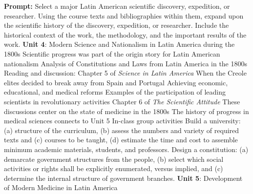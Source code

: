 \documentclass[10pt]{article}
\begin{document}
\begin{outline}[enumerate]
\2 \textbf{Prompt:} Select a major Latin American scientific discovery, expedition, or researcher.  Using the course texts and bibliographies within them, expand upon the scientific history of the discovery, expedition, or researcher.  Include the historical context of the work, the methodology, and the important results of the work.
\1 \textbf{Unit 4}: Modern Science and Nationalism in Latin America during the 1800s
\2 Scientific progress was part of the origin story for Latin American nationalism
\2 Analysis of Constitutions and Laws from Latin America in the 1800s
\2 Reading and discussion:
\3 Chapter 5 of \textit{Science in Latin America}
\4 When the Creole elites decided to break away from Spain and Portugal
\4 Achieving economic, educational, and medical reforms
\4 Examples of the participation of leading scientists in revolutionary activities
\3 Chapter 6 of \textit{The Scientific Attitude}
\4 These discussions center on the state of medicine in the 1800s
\4 The history of progress in medical sciences connects to Unit 5
\2 In-class group activities
\3 Build a university: (a) structure of the curriculum, (b) assess the numbers and variety of required texts and (c) courses to be taught, (d) estimate the time and cost to assemble minimum academic materials, students, and professors.
\3 Design a constitution: (a) demarcate government structures from the people, (b) select which social activities or rights shall be explicitly enumerated, versus implied, and (c) determine the internal structure of government branches.
\1 \textbf{Unit 5}: Development of Modern Medicine in Latin America
\end{outline}
\end{document}
